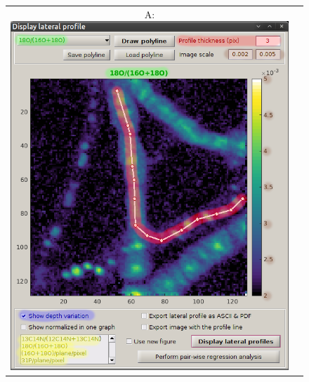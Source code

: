 \begin{figure}[!ht]
\centering
\begin{tabular}{cc}
A: \includegraphics[scale=0.3, valign=t]{figs3/LANS-lateral1}
&

\end{tabular}
\end{figure}

